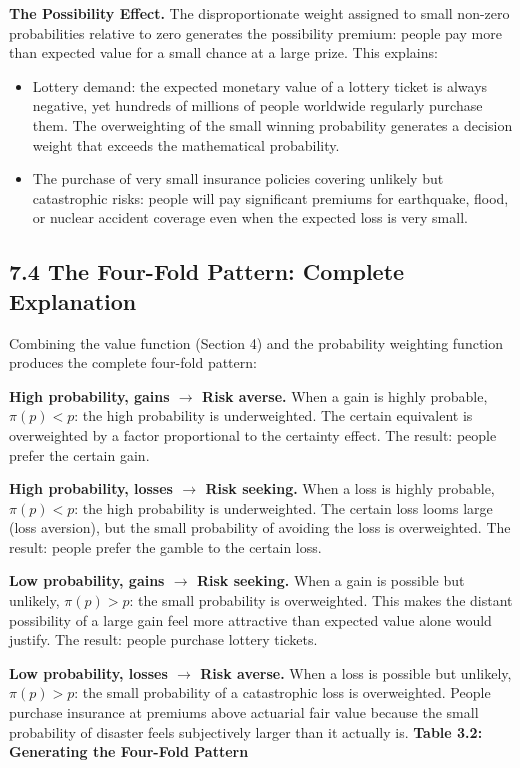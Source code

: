 \documentclass[12pt, letterpaper]{article}
\begin{document}
\textbf{The Possibility Effect.} The disproportionate weight assigned to small non-zero probabilities relative to zero generates the possibility premium: people pay more than expected value for a small chance at a large prize. This explains:
\begin{itemize}
\item Lottery demand: the expected monetary value of a lottery ticket is always negative, yet hundreds of millions of people worldwide regularly purchase them. The overweighting of the small winning probability generates a decision weight that exceeds the mathematical probability.
\item The purchase of very small insurance policies covering unlikely but catastrophic risks: people will pay significant premiums for earthquake, flood, or nuclear accident coverage even when the expected loss is very small.
\end{itemize}


\subsection{7.4 The Four-Fold Pattern: Complete Explanation}


Combining the value function (Section 4) and the probability weighting function produces the complete four-fold pattern:

\textbf{High probability, gains $\rightarrow$ Risk averse.} When a gain is highly probable, $\pi(p) < p$: the high probability is underweighted. The certain equivalent is overweighted by a factor proportional to the certainty effect. The result: people prefer the certain gain.

\textbf{High probability, losses $\rightarrow$ Risk seeking.} When a loss is highly probable, $\pi(p) < p$: the high probability is underweighted. The certain loss looms large (loss aversion), but the small probability of avoiding the loss is overweighted. The result: people prefer the gamble to the certain loss.

\textbf{Low probability, gains $\rightarrow$ Risk seeking.} When a gain is possible but unlikely, $\pi(p) > p$: the small probability is overweighted. This makes the distant possibility of a large gain feel more attractive than expected value alone would justify. The result: people purchase lottery tickets.

\textbf{Low probability, losses $\rightarrow$ Risk averse.} When a loss is possible but unlikely, $\pi(p) > p$: the small probability of a catastrophic loss is overweighted. People purchase insurance at premiums above actuarial fair value because the small probability of disaster feels subjectively larger than it actually is.
\newpage
\textbf{Table 3.2: Generating the Four-Fold Pattern}
\end{document}
